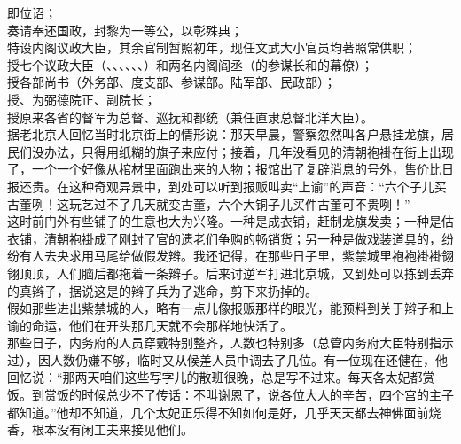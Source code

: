即位诏；\\

奏请奉还国政，封黎为一等公，以彰殊典；\\

特设内阁议政大臣，其余官制暂照初年，现任文武大小官员均著照常供职；\\

授七个议政大臣（、、、、、、）和两名内阁阎丞（的参谋长和的幕僚）；\\

授各部尚书（外务部、度支部、参谋部。陆军部、民政部）；\\

授、为弼德院正、副院长；\\

授原来各省的督军为总督、巡抚和都统（兼任直隶总督北洋大臣）。\\

据老北京人回忆当时北京街上的情形说：那天早晨，警察忽然叫各户悬挂龙旗，居民们没办法，只得用纸糊的旗子来应付；接着，几年没看见的清朝袍褂在街上出现了，一个一个好像从棺材里面跑出来的人物；报馆出了复辟消息的号外，售价比日报还贵。在这种奇观异景中，到处可以听到报贩叫卖“上谕”的声音：“六个子儿买古董咧！这玩艺过不了几天就变古董，六个大铜子儿买件古董可不贵咧！”\\

这时前门外有些铺子的生意也大为兴隆。一种是成衣铺，赶制龙旗发卖；一种是估衣铺，清朝袍褂成了刚封了官的遗老们争购的畅销货；另一种是做戏装道具的，纷纷有人去央求用马尾给做假发辫。我还记得，在那些日子里，紫禁城里袍袍褂褂翎翎顶顶，人们脑后都拖着一条辫子。后来讨逆军打进北京城，又到处可以拣到丢弃的真辫子，据说这是的辫子兵为了逃命，剪下来扔掉的。\\

假如那些进出紫禁城的人，略有一点儿像报贩那样的眼光，能预料到关于辫子和上谕的命运，他们在开头那几天就不会那样地快活了。\\

那些日子，内务府的人员穿戴特别整齐，人数也特别多（总管内务府大臣特别指示过），因人数仍嫌不够，临时又从候差人员中调去了几位。有一位现在还健在，他回忆说：“那两天咱们这些写字儿的散班很晚，总是写不过来。每天各太妃都赏饭。到赏饭的时候总少不了传话：不叫谢恩了，说各位大人的辛苦，四个宫的主子都知道。”他却不知道，几个太妃正乐得不知如何是好，几乎天天都去神佛面前烧香，根本没有闲工夫来接见他们。\\

